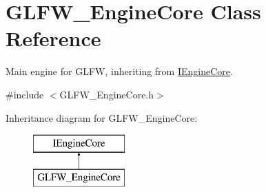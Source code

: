\hypertarget{class_g_l_f_w___engine_core}{}\section{G\+L\+F\+W\+\_\+\+Engine\+Core Class Reference}
\label{class_g_l_f_w___engine_core}


Main engine for G\+L\+FW, inheriting from \mbox{\hyperlink{class_i_engine_core}{I\+Engine\+Core}}.  




{\ttfamily \#include $<$G\+L\+F\+W\+\_\+\+Engine\+Core.\+h$>$}

Inheritance diagram for G\+L\+F\+W\+\_\+\+Engine\+Core\+:\begin{figure}[H]
\begin{center}
\leavevmode
\includegraphics[height=2.000000cm]{class_g_l_f_w___engine_core}
\end{center}
\end{figure}
